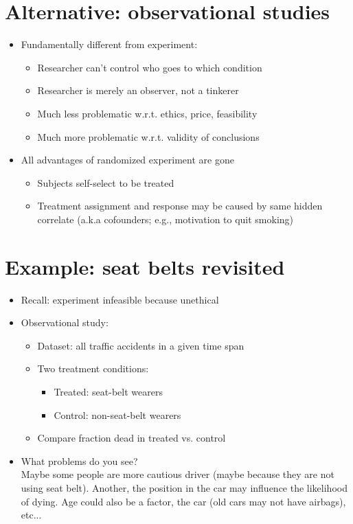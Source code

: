 \documentclass[11pt]{article}
\begin{document}
\section*{Alternative: observational studies}
\begin{itemize}
	\item Fundamentally different from experiment:
		\begin{itemize}
			\item Researcher can't control who goes to which condition
			\item Researcher is merely an observer, not a tinkerer
			\item Much less problematic w.r.t. ethics, price, feasibility
			\item Much more problematic w.r.t. validity of conclusions
		\end{itemize}

	\item All advantages of randomized experiment are gone
		\begin{itemize}
			\item Subjects self-select to be treated
			\item Treatment assignment and response may be caused by same hidden correlate (a.k.a cofounders; e.g., motivation to quit smoking)
		\end{itemize}
\end{itemize}

\section*{Example: seat belts revisited}
\begin{itemize}
	\item Recall: experiment infeasible because unethical
	\item Observational study:
		\begin{itemize}
			\item Dataset: all traffic accidents in a given time span
			\item Two treatment conditions:
				\begin{itemize}
					\item Treated: seat-belt wearers
					\item Control: non-seat-belt wearers
				\end{itemize}
			\item Compare fraction dead in treated vs. control
		\end{itemize}
	\item What problems do you see? \\ 
	Maybe some people are more cautious driver (maybe because they are not using seat belt). Another, the position in the car may influence the likelihood of dying. Age could also be a factor, the car (old cars may not have airbags), etc...
\end{itemize}
\end{document}
